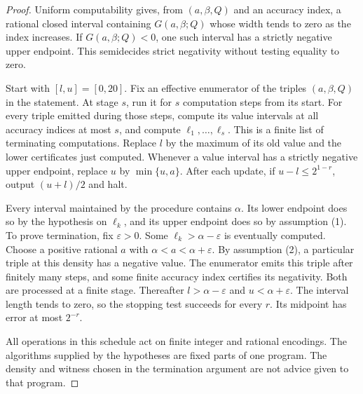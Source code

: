 \begin{proof}
Uniform computability gives, from $(a,\beta,Q)$ and an accuracy index,
a rational closed interval containing $G(a,\beta;Q)$ whose width tends
to zero as the index increases. If $G(a,\beta;Q)<0$, one such interval
has a strictly negative upper endpoint. This semidecides strict
negativity without testing equality to zero.

Start with $[l,u]=[0,20]$. Fix an effective enumerator of the triples
$(a,\beta,Q)$ in the statement. At stage $s$, run it for $s$ computation
steps from its start. For every triple emitted during those steps,
compute its value intervals at all accuracy indices at most $s$, and
compute $\ell_1,\ldots,\ell_s$. This is a finite list of terminating
computations. Replace $l$ by the maximum of its old value and the lower
certificates just computed. Whenever a value interval has a strictly
negative upper endpoint, replace $u$ by $\min\{u,a\}$. After each update,
if $u-l\le2^{1-r}$, output $(u+l)/2$ and halt.

Every interval maintained by the procedure contains $\alpha$. Its lower
endpoint does so by the hypothesis on $\ell_k$, and its upper endpoint
does so by assumption (1). To prove termination, fix $\varepsilon>0$.
Some $\ell_k>\alpha-\varepsilon$ is eventually computed. Choose a positive
rational $a$ with $\alpha<a<\alpha+\varepsilon$. By assumption (2), a
particular triple at this density has a negative value. The enumerator
emits this triple after finitely many steps, and some finite accuracy
index certifies its negativity. Both are processed at a finite stage.
Thereafter $l>\alpha-\varepsilon$ and $u<\alpha+\varepsilon$.
The interval length tends to zero, so the stopping test succeeds for
every $r$. Its midpoint has error at most $2^{-r}$.

All operations in this schedule act on finite integer and rational
encodings. The algorithms supplied by the hypotheses are fixed parts of
one program. The density and witness chosen in the termination argument
are not advice given to that program.
\end{proof}
